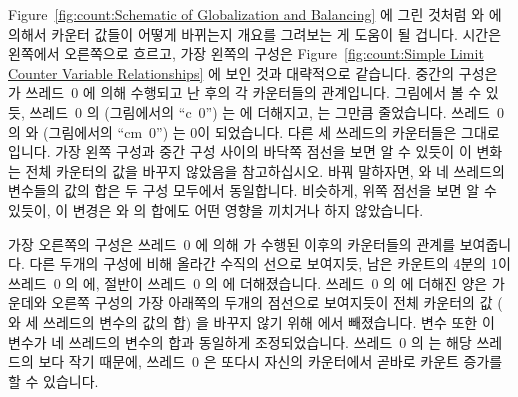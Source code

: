 Figure~\ref{fig:count:Schematic of Globalization and Balancing} 에 그린 것처럼
 와  에 의해서 카운터 값들이 어떻게
바뀌는지 개요를 그려보는 게 도움이 될 겁니다.
시간은 왼쪽에서 오른쪽으로 흐르고, 가장 왼쪽의 구성은
Figure~\ref{fig:count:Simple Limit Counter Variable Relationships} 에 보인 것과
대략적으로 같습니다.
중간의 구성은  가 쓰레드~0 에 의해 수행되고 난 후의 각
카운터들의 관계입니다.
그림에서 볼 수 있듯, 쓰레드~0 의  (그림에서의 ``c~0'') 는
 에 더해지고,  는 그만큼 줄었습니다.
쓰레드~0 의  와  (그림에서의 ``cm~0'') 는 0이
되었습니다.
다른 세 쓰레드의 카운터들은 그대로입니다.
가장 왼쪽 구성과 중간 구성 사이의 바닥쪽 점선을 보면 알 수 있듯이 이 변화는
전체 카운터의 값을 바꾸지 않았음을 참고하십시오.
바꿔 말하자면,  와 네 쓰레드의  변수들의 값의 합은
두 구성 모두에서 동일합니다.
비슷하게, 위쪽 점선을 보면 알 수 있듯이, 이 변경은  와
 의 합에도 어떤 영향을 끼치거나 하지 않았습니다.

가장 오른쪽의 구성은 쓰레드~0 에 의해  가 수행된 이후의
카운터들의 관계를 보여줍니다.
다른 두개의 구성에 비해 올라간 수직의 선으로 보여지듯, 남은 카운트의 4분의 1이
쓰레드~0 의  에, 절반이 쓰레드~0 의  에
더해졌습니다.
쓰레드~0 의  에 더해진 양은 가운데와 오른쪽 구성의 가장 아래쪽의
두개의 점선으로 보여지듯이 전체 카운터의 값 ( 와 세 쓰레드의
 변수의 값의 합) 을 바꾸지 않기 위해  에서
빼졌습니다.
 변수 또한 이 변수가 네 쓰레드의  변수의 합과
동일하게 조정되었습니다.
쓰레드~0 의  는 해당 쓰레드의  보다 작기 때문에,
쓰레드~0 은 또다시 자신의 카운터에서 곧바로 카운트 증가를 할 수 있습니다.
\iffalse


